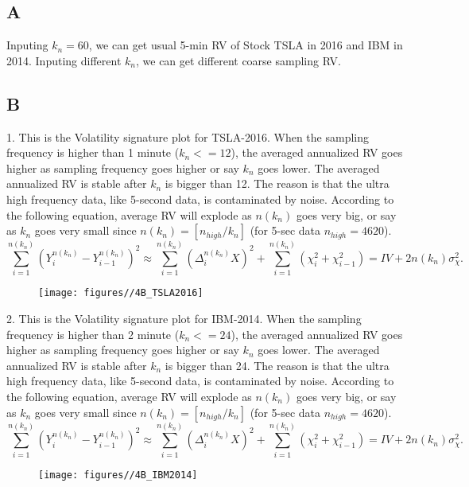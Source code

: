 \documentclass{report}
\begin{document}
\subsection{A}
Inputing $k_{n} =60$, we can get usual 5-min RV of Stock TSLA in 2016 and IBM in 2014. Inputing different $k_{n}$, we can get different coarse sampling RV.

\subsection{B}
1. This is the Volatility signature plot for TSLA-2016. When the sampling frequency is higher than 1 minute ($k_{n} <=12$), the averaged annualized RV goes higher as sampling frequency goes higher or say $k_{n}$ goes lower. The averaged annualized RV is stable after $k_{n}$ is bigger than 12. The reason is that the ultra high frequency data, like 5-second data, is contaminated by noise.  According to the following equation, average RV will explode as $n(k_{n})$ goes very big, or say as $k_{n}$ goes very small since $n(k_{n}) = [n_{high} / k_{n}]$ (for 5-sec data $n_{high} = 4620$).
\[ \sum_{i=1}^{n(k_{n})}( Y_{i}^{n(k_{n})} - Y_{i-1}^{n(k_{n})} )^{2} \approx \sum_{i=1}^{n(k_{n})}( \Delta_{i}^{n(k_{n})}X )^{2} + \sum_{i=1}^{n(k_{n})}( \chi_{i}^{2} + \chi_{i-1}^{2} ) = IV + 2n(k_{n})\sigma_{\chi}^{2}. \]
\begin{figure}[H]
        \centering 
         \texttt{[image: figures//4B\_TSLA2016]}
\end{figure}

2. This is the Volatility signature plot for IBM-2014. When the sampling frequency is higher than 2 minute ($k_{n} <=24$), the averaged annualized RV goes higher as sampling frequency goes higher or say $k_{n}$ goes lower. The averaged annualized RV is stable after $k_{n}$ is bigger than 24. The reason is that the ultra high frequency data, like 5-second data, is contaminated by noise.  According to the following equation, average RV will explode as $n(k_{n})$ goes very big, or say as $k_{n}$ goes very small since $n(k_{n}) = [n_{high} / k_{n}]$ (for 5-sec data $n_{high} = 4620$).
\[ \sum_{i=1}^{n(k_{n})}( Y_{i}^{n(k_{n})} - Y_{i-1}^{n(k_{n})} )^{2} \approx \sum_{i=1}^{n(k_{n})}( \Delta_{i}^{n(k_{n})}X )^{2} + \sum_{i=1}^{n(k_{n})}( \chi_{i}^{2} + \chi_{i-1}^{2} ) = IV + 2n(k_{n})\sigma_{\chi}^{2}. \]
\begin{figure}[H]
        \centering 
         \texttt{[image: figures//4B\_IBM2014]}
\end{figure}
\end{document}
